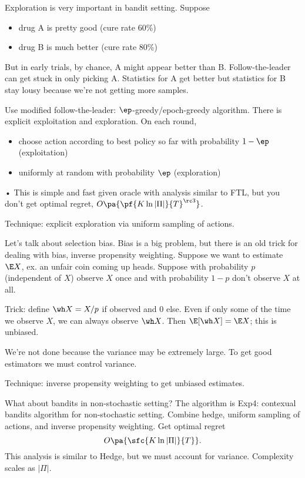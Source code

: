 Exploration is very important in bandit setting. Suppose
\begin{itemize}
\item
drug A is pretty good (cure rate 60\%)
\item
drug B is much better (cure rate 80\%)
\end{itemize}
But in early trials, by chance, A might appear better than B. Follow-the-leader can get stuck in only picking A.
Statistics for A get better but statistics for B stay lousy because we're not getting more samples.

Use modified follow-the-leader: $\ep$-greedy/epoch-greedy algorithm. There is explicit exploitation and exploration. On each round,
\begin{itemize}
\item
choose action according to best policy so far with probability $1-\ep$ (exploitation)
\item
uniformly at random with probability $\ep$ (exploration)
\end{itemize}•
This is simple and fast given oracle with analysis similar to FTL, but you don't get optimal regret, $O\pa{\pf{K\ln |\Pi|}{T}^{\rc 3}}$. 

Technique: explicit exploration via uniform sampling of actions.

Let's talk about selection bias. Bias is a big problem, but there is an old trick for dealing with bias, inverse propensity weighting. Suppose we want to estimate $\E X$, ex. an unfair coin coming up heads. Suppose with probability $p$ (independent of $X$) observe $X$ once and with probability $1-p$ don't observe $X$ at all.

Trick: define $\wh X=X/p$ if observed and 0 else. Even if only some of the time we observe $X$, we can always observe $\wh X$. Then $\E[\wh X] = \E X$; this is unbiased.

We're not done because the variance may be extremely large. To get good estimators we must control variance.

Technique: inverse propensity weighting to get unbiased estimates.

What about bandits in non-stochastic setting? The algorithm is Exp4: contexual bandits algorithm for non-stochastic setting. Combine hedge, uniform sampling of actions, and inverse propensity weighting.
Get optimal regret
$$
O\pa{\sfc{K\ln |\Pi|}{T}}.
$$
This analysis is similar to Hedge, but we must account for variance. Complexity scales as $|\Pi|$.

